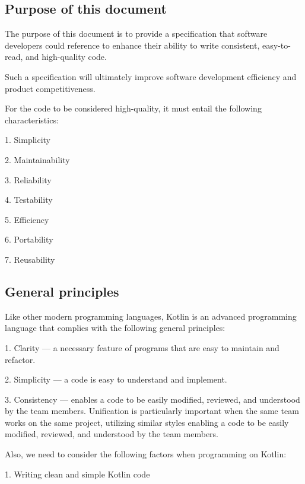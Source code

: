 \subsection*{\textbf{Purpose of this document}}



The purpose of this document is to provide a specification that software developers could reference to enhance their ability to write consistent, easy-to-read, and high-quality code.

Such a specification will ultimately improve software development efficiency and product competitiveness.

For the code to be considered high-quality, it must entail the following characteristics:

1.	Simplicity

2.	Maintainability

3.	Reliability

4.	Testability

5.	Efficiency

6.	Portability

7.	Reusability





\subsection*{\textbf{General principles}}



Like other modern programming languages, Kotlin is an advanced programming language that complies with the following general principles:

1.	Clarity — a necessary feature of programs that are easy to maintain and refactor.

2.	Simplicity — a code is easy to understand and implement.

3.	Consistency — enables a code to be easily modified, reviewed, and understood by the team members. Unification is particularly important when the same team works on the same project, utilizing similar styles enabling a code to be easily modified, reviewed, and understood by the team members.



Also, we need to consider the following factors when programming on Kotlin:



1. Writing clean and simple Kotlin code



